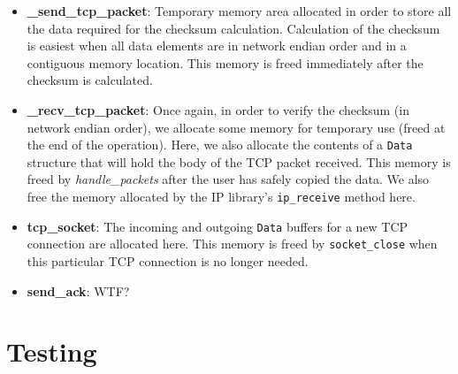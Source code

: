 \documentclass{article}
\begin{document}
\begin{itemize}
\item \textbf{\_send\_tcp\_packet}: Temporary memory area allocated in order to store all the data required for the checksum calculation. Calculation of the checksum is easiest when all data elements are in network endian order and in a contiguous memory location. This memory is freed immediately after the checksum is calculated.

\item \textbf{\_recv\_tcp\_packet}: Once again, in order to verify the checksum (in network endian order), we allocate some memory for temporary use (freed at the end of the operation). Here, we also allocate the contents of a \texttt{Data} structure that will hold the body of the TCP packet received. This memory is freed by \textit{handle\_packets} after the user has safely copied the data. We also free the memory allocated by the IP library's \texttt{ip\_receive} method here.

\item \textbf{tcp\_socket}: The incoming and outgoing \texttt{Data} buffers for a new TCP connection are allocated here. This memory is freed by \texttt{socket\_close} when this particular TCP connection is no longer needed.

\item \textbf{send\_ack}: WTF?
\end{itemize}
\section{Testing}
\end{document}
